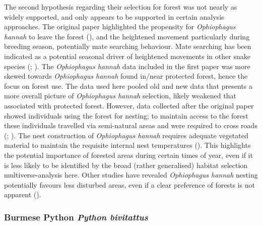 \documentclass[10pt,a4paper]{article}
\begin{document}
The second hypothesis regarding their selection for forest was not nearly as widely supported, and only appears to be supported in certain analysis approaches.
The original paper highlighted the propensity for \emph{Ophiophagus hannah} to leave the forest (), and the heightened movement particularly during breeding season, potentially mate searching behaviour.
Mate searching has been indicated as a potential seasonal driver of heightened movements in other snake species (; ).
The \emph{Ophiophagus hannah} data included in the first paper was more skewed towards \emph{Ophiophagus hannah} found in/near protected forest, hence the focus on forest use.
The data used here pooled old and new data that presents a more overall picture of \emph{Ophiophagus hannah} selection, likely weakened that associated with protected forest.
However, data collected after the original paper showed individuals using the forest for nesting; to maintain access to the forest these individuals travelled via semi-natural areas and were required to cross roads (; ).
The nest construction of \emph{Ophiophagus hannah} requires adequate vegetated material to maintain the requisite internal nest temperatures ().
This highlights the potential importance of forested areas during certain times of year, even if it is less likely to be identified by the broad (rather generalised) habitat selection multiverse-analysis here.
Other studies have revealed \emph{Ophiophagus hannah} nesting potentially favours less disturbed areas, even if a clear preference of forests is not apparent ().

\subsubsection{\texorpdfstring{Burmese Python \emph{Python bivitattus}}{Burmese Python Python bivitattus}}\label{burmese-python-python-bivitattus}
\end{document}
